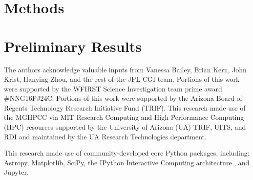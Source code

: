 \documentclass[]{spie}  %
\begin{document}
\section{Methods}



\section{Preliminary Results}

    
\acknowledgments %


The authors acknowledge valuable inputs from  Vanessa Bailey,  Brian Kern, John Krist, Hanying Zhou,   and the rest of the JPL CGI team.
Portions of this work were supported by the WFIRST Science Investigation team prime award \#NNG16PJ24C.
Portions of this work were supported by the Arizona Board of Regents Technology Research
Initiative Fund (TRIF).
This research made use of the \gls{MGHPCC} via MIT Research Computing and High Performance Computing (HPC) resources supported by the University of Arizona (UA) TRIF, UITS, and RDI and maintained by the UA Research Technologies department.


This research made use of community-developed core Python packages, including: Astropy\cite{the_astropy_collaboration_astropy_2013}, Matplotlib\cite{hunter_matplotlib_2007}, SciPy\cite{jones_scipy_2001}, 
the IPython Interactive Computing architecture \cite{perez_ipython_2007}, and Jupyter\cite{kluyver_jupyter_2016}.
\end{document}
